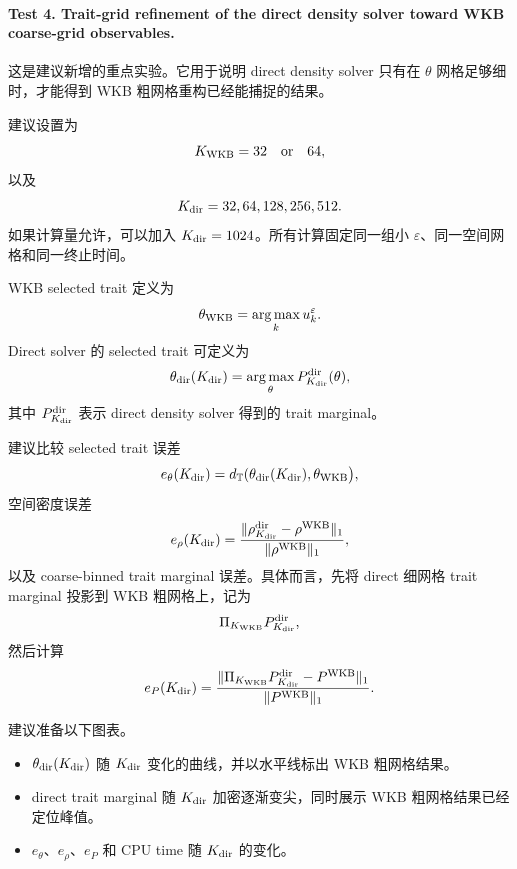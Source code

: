 \documentclass[11pt,a4paper]{ctexart}
\newcommand{\eps}{\varepsilon}
\newcommand{\argmax}{\operatorname*{arg\,max}}
\begin{document}
\paragraph{Test 4. Trait-grid refinement of the direct density solver toward WKB coarse-grid observables.}

这是建议新增的重点实验。它用于说明 direct density solver 只有在 $\theta$ 网格足够细时，才能得到 WKB 粗网格重构已经能捕捉的结果。

建议设置为
\begin{equation*}
    K_{\rm WKB}=32 \quad \text{or} \quad 64,
\end{equation*}
以及
\begin{equation*}
    K_{\rm dir}=32,64,128,256,512.
\end{equation*}
如果计算量允许，可以加入 $K_{\rm dir}=1024$。所有计算固定同一组小 $\eps$、同一空间网格和同一终止时间。

WKB selected trait 定义为
\begin{equation*}
    \theta_{\rm WKB}=\argmax_k u_k^\eps.
\end{equation*}
Direct solver 的 selected trait 可定义为
\begin{equation*}
    \theta_{\rm dir}(K_{\rm dir})
    = \argmax_\theta P^{\rm dir}_{K_{\rm dir}}(\theta),
\end{equation*}
其中 $P^{\rm dir}_{K_{\rm dir}}$ 表示 direct density solver 得到的 trait marginal。

建议比较 selected trait 误差
\begin{equation*}
    e_\theta(K_{\rm dir})
    = d_{\mathbb T}(
    \theta_{\rm dir}(K_{\rm dir}),
    \theta_{\rm WKB}
    \bigr),
\end{equation*}
空间密度误差
\begin{equation*}
    e_\rho(K_{\rm dir})
    =
    \frac{
    \|\rho^{\rm dir}_{K_{\rm dir}}-\rho^{\rm WKB}\|_1
    }{
    \|\rho^{\rm WKB}\|_1
    },
\end{equation*}
以及 coarse-binned trait marginal 误差。具体而言，先将 direct 细网格 trait marginal 投影到 WKB 粗网格上，记为
\begin{equation*}
    \Pi_{K_{\rm WKB}} P^{\rm dir}_{K_{\rm dir}},
\end{equation*}
然后计算
\begin{equation*}
    e_P(K_{\rm dir})
    =
    \frac{
    \|\Pi_{K_{\rm WKB}} P^{\rm dir}_{K_{\rm dir}}
    - P^{\rm WKB}\|_1
    }{
    \|P^{\rm WKB}\|_1
    }.
\end{equation*}

建议准备以下图表。
\begin{itemize}
    \item $\theta_{\rm dir}(K_{\rm dir})$ 随 $K_{\rm dir}$ 变化的曲线，并以水平线标出 WKB 粗网格结果。
    \item direct trait marginal 随 $K_{\rm dir}$ 加密逐渐变尖，同时展示 WKB 粗网格结果已经定位峰值。
    \item $e_\theta$、$e_\rho$、$e_P$ 和 CPU time 随 $K_{\rm dir}$ 的变化。
\end{itemize}
\end{document}
